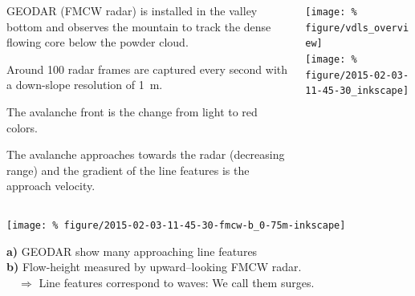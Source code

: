 \documentclass[unknownkeysallowed,usepdftitle=false]{beamer}
\newcommand{\secvariable}{nothing}
\newcommand{\mysection}[1]{\renewcommand{\secvariable}{#1}
}
\begin{document}
\mysection{radar}
\begin{frame}\label{\secvariable}
  \begin{columns}[t]
    \begin{column}[c]{0.5\textwidth}
      GEODAR (FMCW radar) is installed in the valley bottom and observes the mountain to track the dense flowing core below the powder cloud.

\vspace{0.2cm}
Around \SI{100}{} radar frames are captured every second
with a down-slope resolution of \SI{1}{\metre}.

    \vspace{0.2cm}
    The avalanche front is the change from light to red colors. 
    
    \vspace{0.2cm}
    The avalanche
approaches towards the radar (decreasing range) and the gradient of the
line features is the approach velocity.
    \end{column}
    \begin{column}[c]{0.5\textwidth}
     
\texttt{[image: \%
figure/vdls\_overview]}\\
\texttt{[image: \%
figure/2015-02-03-11-45-30\_inkscape]}
    \end{column}
  \end{columns}

  
\end{frame}

\mysection{line}
\begin{frame}\label{\secvariable}
\begin{center}
  \vspace{-0.5cm}
 \texttt{[image: \%
  figure/2015-02-03-11-45-30-fmcw-b\_0-75m-inkscape]}
\end{center}
  \vspace{-0.5cm}
  \textbf{a)} GEODAR show many approaching line features\\
  \textbf{b)} Flow-height measured by upward--looking FMCW radar.\\
  $\quad \Rightarrow$ Line features correspond to waves: We call them surges.
  
\end{frame}
\end{document}
